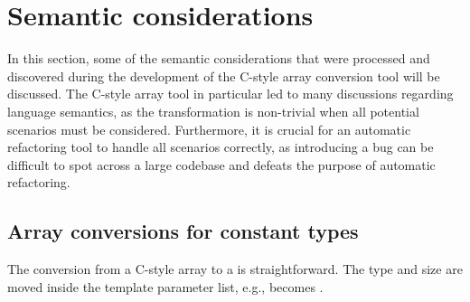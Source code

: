 
\section{Semantic considerations}
In this section, some of the semantic considerations that were processed and discovered during the development of the C-style array conversion tool will be discussed.
The C-style array tool in particular led to many discussions regarding language semantics, as the transformation is non-trivial when all potential scenarios must be considered.
Furthermore, it is crucial for an automatic refactoring tool to handle all scenarios correctly, as introducing a bug can be difficult to spot across a large codebase and defeats the purpose of automatic refactoring.

\subsection{Array conversions for constant types} \label{subsec:095:030:array_conversions}

The conversion from a C-style  array to a  is straightforward. The type and size are moved inside the template parameter list, e.g.,  becomes .

